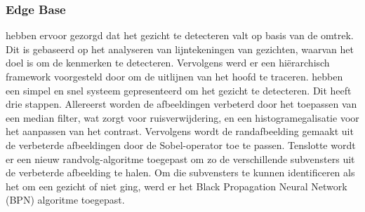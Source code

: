 \subsubsection{Edge Base}
\textcite{sakai1972} hebben ervoor gezorgd dat het gezicht te detecteren valt op basis van de omtrek. Dit is gebaseerd op het analyseren van lijntekeningen van gezichten, waarvan het doel is om de kenmerken te detecteren. Vervolgens werd er een hiërarchisch framework voorgesteld door \textcite{CRAW1987} om de uitlijnen van het hoofd te traceren. \textcite{anila2010} hebben een simpel en snel systeem gepresenteerd om het gezicht te detecteren. Dit heeft drie stappen. Allereerst worden de afbeeldingen verbeterd door het toepassen van een median filter, wat zorgt voor ruisverwijdering, en een histogramegalisatie voor het aanpassen van het contrast. Vervolgens wordt de randafbeelding gemaakt uit de verbeterde afbeeldingen door de Sobel-operator toe te passen. Tenslotte wordt er een nieuw randvolg-algoritme toegepast om zo de verschillende subvensters uit de verbeterde afbeelding te halen. Om die subvensters te kunnen identificeren als het om een gezicht of niet ging, werd er het Black Propagation Neural Network (BPN) algoritme toegepast.